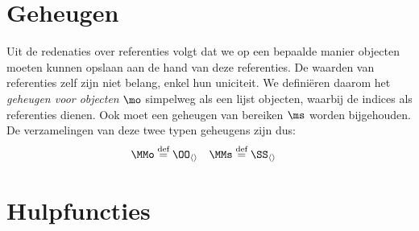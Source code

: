 \section{Geheugen}
\label{sec:locaties}

Uit de redenaties over referenties volgt dat we op een bepaalde manier objecten moeten kunnen opslaan aan de hand van deze referenties. De waarden van referenties zelf zijn niet belang, enkel hun uniciteit. We definiëren daarom het \emph{geheugen voor objecten} $\mo$ simpelweg als een lijst objecten, waarbij de indices als referenties dienen. Ook moet een geheugen van bereiken $\ms$ worden bijgehouden. De verzamelingen van deze twee typen geheugens zijn dus:
%
\begin{align*}
  \MMo &\DEF \OO_{\langle\rangle} &
  \MMs &\DEF \SS_{\langle\rangle}
\end{align*}

\section{Hulpfuncties}
\label{sec:hulpfuncties}

